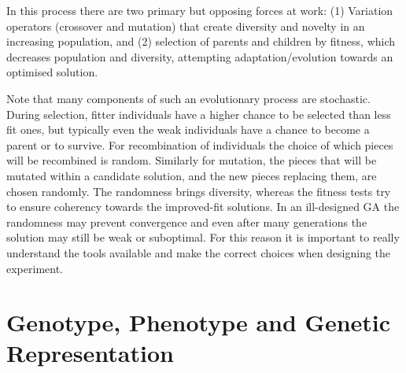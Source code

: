 In this process there are two primary but opposing forces at work: (1) Variation operators (crossover and mutation) that create diversity and novelty in an increasing population, and (2)  selection of parents and children by fitness, which decreases population and diversity, attempting adaptation/evolution towards an optimised solution.

Note that many components of such an evolutionary process are stochastic. During selection, fitter individuals have a higher chance to be selected than less fit ones, but typically even the weak individuals have a chance to become a parent or to survive. For recombination of individuals the choice of which pieces will be recombined is random. Similarly for mutation, the pieces that will be mutated within a candidate solution, and the new pieces replacing them, are chosen randomly. The randomness brings diversity, whereas the fitness tests try to ensure coherency towards the improved-fit solutions.   In an ill-designed GA the randomness may prevent convergence and even after many generations the solution may still be weak or suboptimal. For this reason it is important to really understand the tools available and make the correct choices when designing the experiment.





\section{Genotype, Phenotype and Genetic Representation}


